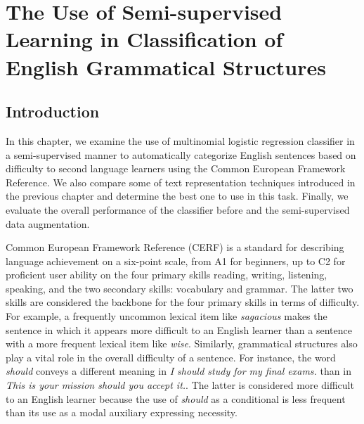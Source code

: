 
\chapter{The Use of Semi-supervised Learning in Classification of English Grammatical Structures} %

\label{Chapter2} %

\section{Introduction}

In this chapter, we examine the use of multinomial logistic regression classifier in a semi-supervised manner to automatically categorize English sentences based on difficulty to second language learners using the Common European Framework Reference. We also compare some of text representation techniques introduced in the previous chapter and determine the best one to use in this task. Finally, we evaluate the overall performance of the classifier before and the semi-supervised data augmentation. 

Common European Framework Reference (CERF) is a standard for describing language achievement on a six-point scale, from A1 for beginners, up to C2 for proficient user ability on the four primary skills reading, writing, listening, speaking, and the two secondary skills: vocabulary and grammar. The latter two skills are considered the backbone for the four primary skills in terms of difficulty. For example, a frequently uncommon lexical item like \emph{sagacious} makes the sentence in which it appears more difficult to an English learner than a sentence with a more frequent lexical item like \emph{wise}. Similarly, grammatical structures also play a vital role in the overall difficulty of a sentence. For instance, the word \emph{should} conveys a different meaning in \emph{I should study for my final exams.} than in \emph{This is your mission should you accept it.}. The latter is considered more difficult to an English learner because the use of \emph{should} as a conditional is less frequent than its use as a modal auxiliary expressing necessity. 

